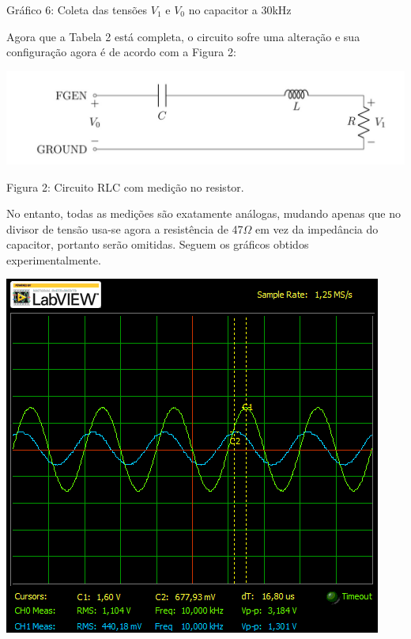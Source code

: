 \documentclass[a4 paper]{article}
\begin{document}
\begin{center}
Gráfico 6: Coleta das tensões $V_1$ e $V_0$ no capacitor a 30kHz
\end{center}

\newpage



Agora que a Tabela 2 está completa, o circuito sofre uma alteração e sua configuração agora é de acordo com a Figura 2:

\begin{table}[h]
\centering
\includegraphics[scale=0.5]{figuras/circuito2}
\end{table}

\begin{center}
Figura 2: Circuito RLC com medição no resistor.
\end{center}

No entanto, todas as medições são exatamente análogas, mudando apenas que no divisor de tensão usa-se agora a resistência de 47$\Omega$ em vez da impedância do capacitor, portanto serão omitidas. Seguem os gráficos obtidos experimentalmente.

\newpage
\begin{table}[h]
\centering
\includegraphics[scale=0.7]{graficos/circ2/rgadicoa2-2-10}
\end{table}
\end{document}
